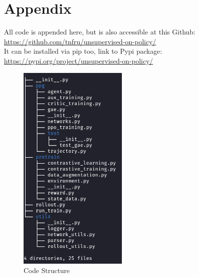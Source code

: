 \documentclass{article}
\begin{document}
\section{Appendix}
All code is appended here, but is also accessible at this Github: \url{https://github.com/tnfru/unsupervised-on-policy/}\\
It can be installed via pip too, link to Pypi package: \url{https://pypi.org/project/unsupervised-on-policy/}
\begin{figure}[h]
  \centering
  \includegraphics[width = 150pt]{code_struct.png}
  \caption{Code Structure}
\end{figure}
\newpage
\end{document}
